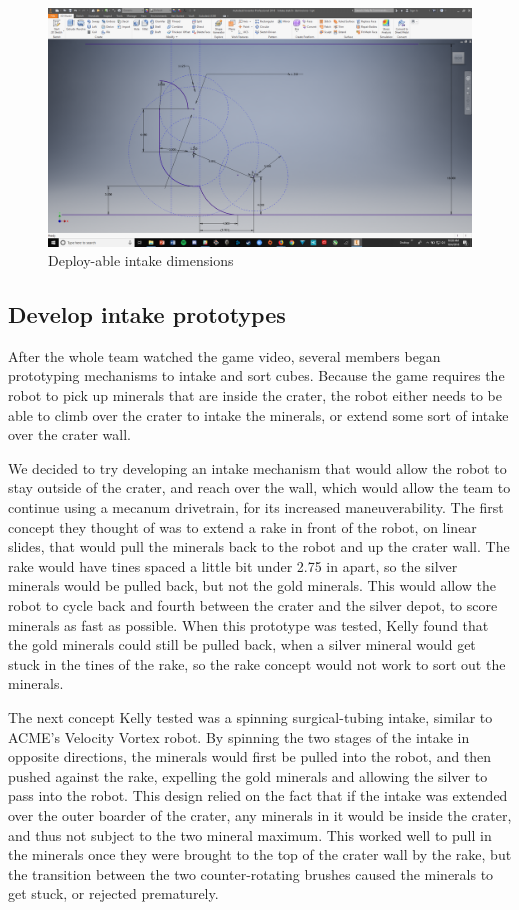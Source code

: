 \documentclass{article}
\newif\ifcontents
\begin{document}
\contentsfalse

\begin{figure}
    \centering
    \includegraphics[width=.6\textwidth]{02_09-10/images/intakesketch.png}
    \caption{Deploy-able intake dimensions}
    \label{fig:intake}
\end{figure}

\subsection{Develop intake prototypes}
After the whole team watched the game video, several members began prototyping mechanisms to intake and sort cubes. Because the game requires the robot to pick up minerals that are inside the crater, the robot either needs to be able to climb over the crater to intake the minerals, or extend some sort of intake over the crater wall. 

We decided to try developing an intake mechanism that would allow the robot to stay outside of the crater, and reach over the wall, which would allow the team to continue using a mecanum drivetrain, for its increased maneuverability. The first concept they thought of was to extend a rake in front of the robot, on linear slides, that would pull the minerals back to the robot and up the crater wall. The rake would have tines spaced a little bit under 2.75 in apart, so the silver minerals would be pulled back, but not the gold minerals. This would allow the robot to cycle back and fourth between the crater and the silver depot, to score minerals as fast as possible. When this prototype was tested, Kelly found that the gold minerals could still be pulled back, when a silver mineral would get stuck in the tines of the rake, so the rake concept would not work to sort out the minerals. 

The next concept Kelly tested was a spinning surgical-tubing intake, similar to ACME's Velocity Vortex robot. By spinning the two stages of the intake in opposite directions, the minerals would first be pulled into the robot, and then pushed against the rake, expelling the gold minerals and allowing the silver to pass into the robot. This design relied on the fact that if the intake was extended over the outer boarder of the crater, any minerals in it would be inside the crater, and thus not subject to the two mineral maximum. This worked well to pull in the minerals once they were brought to the top of the crater wall by the rake, but the transition between the two counter-rotating brushes caused the minerals to get stuck, or rejected prematurely. 
\end{document}
